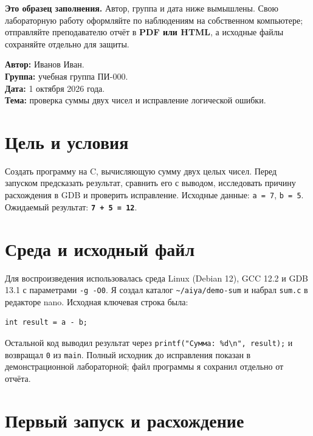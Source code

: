 \textbf{Это образец заполнения.} Автор, группа и дата ниже вымышлены.
Свою лабораторную работу оформляйте по наблюдениям на собственном
компьютере; отправляйте преподавателю отчёт в \textbf{PDF или HTML}, а
исходные файлы сохраняйте отдельно для защиты.

\textbf{Автор:} Иванов Иван.\\
\textbf{Группа:} учебная группа ПИ-000.\\
\textbf{Дата:} 1 октября 2026 года.\\
\textbf{Тема:} проверка суммы двух чисел и исправление логической
ошибки.

\hypertarget{ux446ux435ux43bux44c-ux438-ux443ux441ux43bux43eux432ux438ux44f}{%
\section{Цель и
условия}\label{ux446ux435ux43bux44c-ux438-ux443ux441ux43bux43eux432ux438ux44f}}

Создать программу на C, вычисляющую сумму двух целых чисел. Перед
запуском предсказать результат, сравнить его с выводом, исследовать
причину расхождения в GDB и проверить исправление. Исходные данные:
\texttt{a\ =\ 7}, \texttt{b\ =\ 5}. Ожидаемый результат:
\textbf{\texttt{7\ +\ 5\ =\ 12}}.

\hypertarget{ux441ux440ux435ux434ux430-ux438-ux438ux441ux445ux43eux434ux43dux44bux439-ux444ux430ux439ux43b}{%
\section{Среда и исходный
файл}\label{ux441ux440ux435ux434ux430-ux438-ux438ux441ux445ux43eux434ux43dux44bux439-ux444ux430ux439ux43b}}

Для воспроизведения использовалась среда Linux (Debian 12), GCC 12.2 и
GDB 13.1 с параметрами \texttt{-g\ -O0}. Я создал каталог
\texttt{\textasciitilde{}/aiya/demo-sum} и набрал \texttt{sum.c} в
редакторе nano. Исходная ключевая строка была:

\begin{verbatim}
int result = a - b;
\end{verbatim}

Остальной код выводил результат через
\texttt{printf("Сумма:\ \%d\textbackslash{}n",\ result);} и возвращал
\texttt{0} из \texttt{main}. Полный исходник до исправления показан в
демонстрационной лабораторной; файл программы я сохранил отдельно от
отчёта.

\hypertarget{ux43fux435ux440ux432ux44bux439-ux437ux430ux43fux443ux441ux43a-ux438-ux440ux430ux441ux445ux43eux436ux434ux435ux43dux438ux435}{%
\section{Первый запуск и
расхождение}\label{ux43fux435ux440ux432ux44bux439-ux437ux430ux43fux443ux441ux43a-ux438-ux440ux430ux441ux445ux43eux436ux434ux435ux43dux438ux435}}

